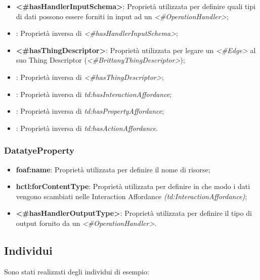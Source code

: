 \begin{itemize}
	\item \textbf{<\#hasHandlerInputSchema>}: Proprietà utilizzata per definire quali tipi di dati possono essere forniti in input ad un \textit{<\#OperationHandler>};

	\item {}: Proprietà inversa di \textit{<\#hasHandlerInputSchema>};

	\item \textbf{<\#hasThingDescriptor>}: Proprietà utilizzata per legare un \textit{<\#Edge>} al suo Thing Descriptor (\textit{<\#BrittanyThingDescriptor>});

	\item {}: Proprietà inversa di \textit{<\#hasThingDescriptor>};

	\item {}: Proprietà inversa di \textit{td:hasInteractionAffordance};

	\item {}: Proprietà inversa di \textit{td:hasPropertyAffordance};

	\item {}: Proprietà inversa di \textit{td:hasActionAffordance}.

\end{itemize}

\subsubsection{DatatyeProperty}
\begin{itemize}
	\item \textbf{foaf:name}: Proprietà utilizzata per definire il nome di risorse;

	\item \textbf{hctl:forContentType}: Proprietà utilizzata per definire in che modo i dati vengono scambiati nelle Interaction Affordance \textit{(td:InteractionAffordance)};

	\item \textbf{<\#hasHandlerOutputType>}: Proprietà utilizzata per definire il tipo di output fornito da un \textit{<\#OperationHandler>}.

\end{itemize}


\subsection{Individui}
Sono stati realizzati degli individui di esempio:\newline

